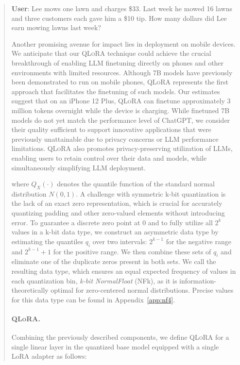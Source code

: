 \begin{quote}
    \textbf{User}: Lee mows one lawn and charges \$33. Last week he mowed 16 lawns and three customers each gave him a \$10 tip. How many dollars did Lee earn mowing lawns last week?

Another promising avenue for impact lies in deployment on mobile devices. We anticipate that our \textsc{QLoRA} technique could achieve the crucial breakthrough of enabling LLM finetuning directly on phones and other environments with limited resources. Although 7B models have previously been demonstrated to run on mobile phones, \textsc{QLoRA} represents the first approach that facilitates the finetuning of such models. Our estimates suggest that on an iPhone 12 Plus, \textsc{QLoRA} can finetune approximately 3 million tokens overnight while the device is charging. While finetuned 7B models do not yet match the performance level of ChatGPT, we consider their quality sufficient to support innovative applications that were previously unattainable due to privacy concerns or LLM performance limitations. \textsc{QLoRA} also promotes privacy-preserving utilization of LLMs, enabling users to retain control over their data and models, while simultaneously simplifying LLM deployment.

where $Q_X(\cdot)$ denotes the quantile function of the standard normal distribution $N(0,1)$. A challenge with symmetric k-bit quantization is the lack of an exact zero representation, which is crucial for accurately quantizing padding and other zero-valued elements without introducing error. To guarantee a discrete zero point at $0$ and to fully utilize all $2^k$ values in a k-bit data type, we construct an asymmetric data type by estimating the quantiles $q_i$ over two intervals: $2^{k-1}$ for the negative range and $2^{k-1}+1$ for the positive range. We then combine these sets of $q_i$ and eliminate one of the duplicate zeros present in both sets. We call the resulting data type, which ensures an equal expected frequency of values in each quantization bin, \emph{k-bit NormalFloat} (NFk), as it is information-theoretically optimal for zero-centered normal distributions. Precise values for this data type can be found in Appendix~\ref{app:nf4}.

\paragraph{\textsc{QLoRA}.} Combining the previously described components, we define \textsc{QLoRA} for a single linear layer in the quantized base model equipped with a single LoRA adapter as follows:


\end{quote}
